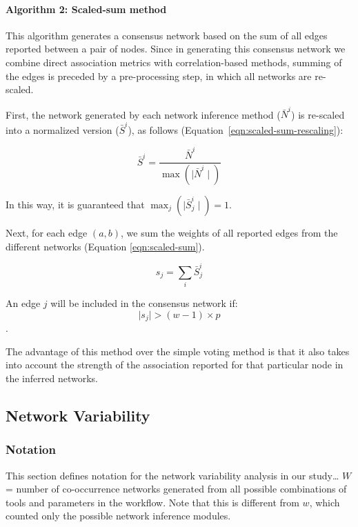   \paragraph*{Algorithm 2: Scaled-sum method}

  This algorithm generates a consensus network based on the sum of all edges reported between a pair of nodes. Since in generating this consensus network we combine direct association metrics with correlation-based methods, summing of the edges is preceded by a pre-processing step, in which all networks are re-scaled.

  First, the network generated by each network inference method ($\bar{N}^i$) is re-scaled into a normalized version ($\bar{S}^i$), as follows  (Equation~\ref{eqn:scaled-sum-rescaling}):


  \begin{equation}
    \bar{S}^{i} = \frac{\bar{N}^{i}}{\max(\mid \bar{N}^{i} \mid)}
    \label{eqn:scaled-sum-rescaling}
  \end{equation}

    In this way, it is guaranteed that $\max_{j}(\mid \bar{S}^i_j \mid) = 1$.


  Next, for each edge $(a,b)$, we sum the weights of all reported edges from the different networks (Equation \ref{eqn:scaled-sum}).

  \begin{equation}
    s_j = \sum_i \bar{S}^i_j
    \label{eqn:scaled-sum}
  \end{equation}


  An edge $j$ will be included in the consensus network if:
  \begin{equation}
    \mid s_j \mid > (w - 1) \times p
    \label{eq:scaled-sum2}
  \end{equation}.

  The advantage of this method over the simple voting method is that it also takes into account the strength of the association reported for that particular node in the inferred networks.

  \subsection*{Network Variability}
  \vspace{-5mm}


  \subsubsection*{Notation}
  \vspace{-5mm}
  This section defines notation for the network variability analysis in our study\dots
  $W$ =  number of co-occurrence networks generated from all possible combinations of tools and parameters in the workflow. Note that this is different from $w$, which counted only the possible network inference modules.

